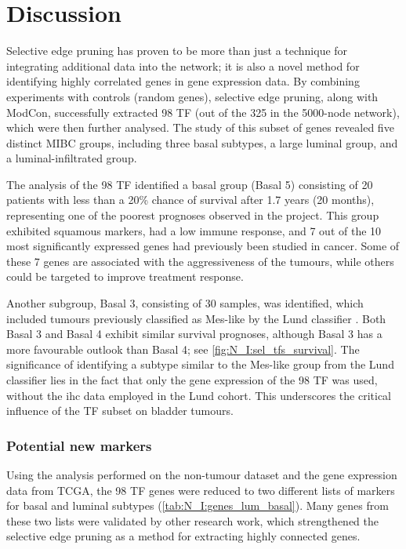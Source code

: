 \section{Discussion}

Selective edge pruning has proven to be more than just a technique for integrating additional data into the network; it is also a novel method for identifying highly correlated genes in gene expression data. By combining experiments with controls (random genes), selective edge pruning, along with ModCon, successfully extracted 98 TF (out of the 325 in the 5000-node network), which were then further analysed. The study of this subset of genes revealed five distinct MIBC groups, including three basal subtypes, a large luminal group, and a luminal-infiltrated group.

The analysis of the 98 TF identified a basal group (Basal 5) consisting of 20 patients with less than a 20\% chance of survival after 1.7 years (20 months), representing one of the poorest prognoses observed in the project. This group exhibited squamous markers, had a low immune response, and 7 out of the 10 most significantly expressed genes had previously been studied in cancer. Some of these 7 genes are associated with the aggressiveness of the tumours, while others could be targeted to improve treatment response.

Another subgroup, Basal 3, consisting of 30 samples, was identified, which included tumours previously classified as Mes-like by the Lund classifier \citep{Marzouka2018-ge}. Both Basal 3 and Basal 4 exhibit similar survival prognoses, although Basal 3 has a more favourable outlook than Basal 4; see \cref{fig:N_I:sel_tfs_survival}. The significance of identifying a subtype similar to the Mes-like group from the Lund classifier lies in the fact that only the gene expression of the 98 TF was used, without the \acrlong{ihc} data employed in the Lund cohort. This underscores the critical influence of the TF subset on bladder tumours.



\subsubsection*{Potential new markers}

Using the analysis performed on the non-tumour dataset and the gene expression data from TCGA, the 98 TF genes were reduced to two different lists of markers for basal and luminal subtypes (\cref{tab:N_I:genes_lum_basal}). Many genes from these two lists were validated by other research work, which strengthened the selective edge pruning as a method for extracting highly connected genes.

